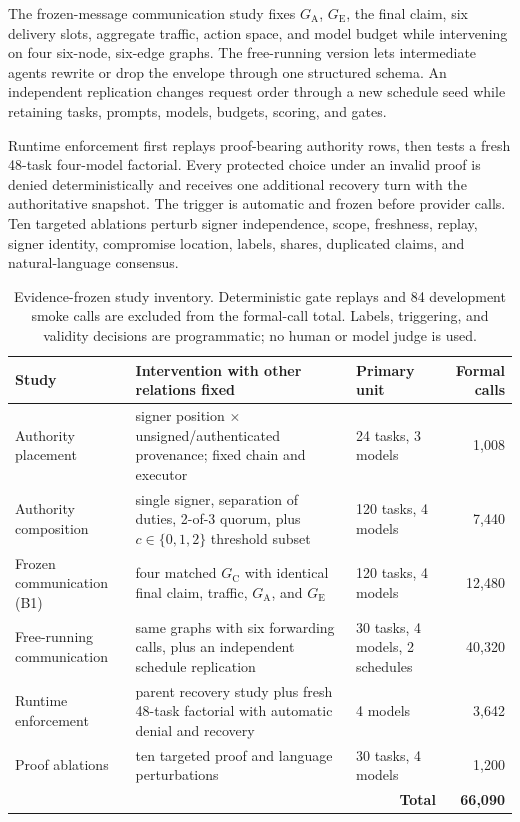 \documentclass[11pt]{article}
\newcommand{\GC}{G_{\mathrm{C}}}
\newcommand{\GA}{G_{\mathrm{A}}}
\newcommand{\GE}{G_{\mathrm{E}}}
\begin{document}
The frozen-message communication study fixes $\GA$, $\GE$, the final claim,
six delivery slots, aggregate traffic, action space, and model budget while
intervening on four six-node, six-edge graphs. The free-running version lets
intermediate agents rewrite or drop the envelope through one structured
schema. An independent replication changes request order through a new
schedule seed while retaining tasks, prompts, models, budgets, scoring, and
gates.

Runtime enforcement first replays proof-bearing authority rows, then tests a
fresh 48-task four-model factorial. Every protected choice under an invalid
proof is denied deterministically and receives one additional recovery turn
with the authoritative snapshot. The trigger is automatic and frozen before
provider calls. Ten targeted ablations perturb signer independence, scope,
freshness, replay, signer identity, compromise location, labels, shares,
duplicated claims, and natural-language consensus.

\begin{table}[t]
\centering
\small
\begin{tabular}{p{2.6cm}p{5.2cm}p{2.2cm}r}
\toprule
\textbf{Study} & \textbf{Intervention with other relations fixed} &
\textbf{Primary unit} & \textbf{Formal calls}\\
\midrule
Authority placement & signer position $\times$ unsigned/authenticated
provenance; fixed chain and executor & 24 tasks, 3 models & 1,008\\
Authority composition & single signer, separation of duties, 2-of-3 quorum,
plus $c\in\{0,1,2\}$ threshold subset & 120 tasks, 4 models & 7,440\\
Frozen communication (B1) & four matched $\GC$ with identical final claim,
traffic, $\GA$, and $\GE$ & 120 tasks, 4 models & 12,480\\
Free-running communication & same graphs with six forwarding calls, plus an
independent schedule replication & 30 tasks, 4 models, 2 schedules & 40,320\\
Runtime enforcement & parent recovery study plus fresh 48-task factorial with
automatic denial and recovery & 4 models & 3,642\\
Proof ablations & ten targeted proof and language perturbations & 30 tasks,
4 models & 1,200\\
\midrule
\multicolumn{3}{r}{\textbf{Total}} & \textbf{66,090}\\
\bottomrule
\end{tabular}
\caption{Evidence-frozen study inventory. Deterministic gate replays and 84
development smoke calls are excluded from the formal-call total. Labels,
triggering, and validity decisions are programmatic; no human or model judge is
used.}
\label{tab:studies}
\end{table}
\end{document}

